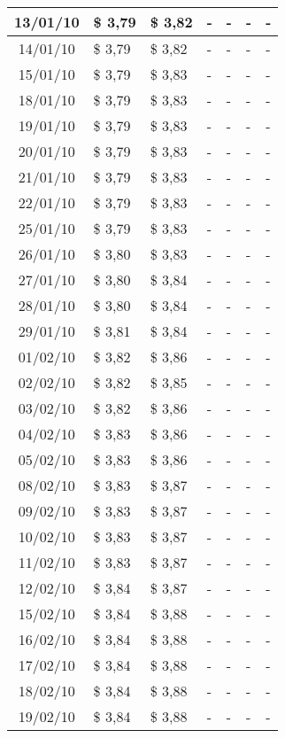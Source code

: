 \begin{center}
\begin{longtable}{|c|p{1.5cm}|p{1.5cm}|p{1.5cm}|p{1.5cm}|p{1.5cm}|p{1.5cm}|}
13/01/10 & \$ 3,79 & \$ 3,82 & - & - & - & - \\ \hline
14/01/10 & \$ 3,79 & \$ 3,82 & - & - & - & - \\ \hline
15/01/10 & \$ 3,79 & \$ 3,83 & - & - & - & - \\ \hline
18/01/10 & \$ 3,79 & \$ 3,83 & - & - & - & - \\ \hline
19/01/10 & \$ 3,79 & \$ 3,83 & - & - & - & - \\ \hline
20/01/10 & \$ 3,79 & \$ 3,83 & - & - & - & - \\ \hline
21/01/10 & \$ 3,79 & \$ 3,83 & - & - & - & - \\ \hline
22/01/10 & \$ 3,79 & \$ 3,83 & - & - & - & - \\ \hline
25/01/10 & \$ 3,79 & \$ 3,83 & - & - & - & - \\ \hline
26/01/10 & \$ 3,80 & \$ 3,83 & - & - & - & - \\ \hline
27/01/10 & \$ 3,80 & \$ 3,84 & - & - & - & - \\ \hline
28/01/10 & \$ 3,80 & \$ 3,84 & - & - & - & - \\ \hline
29/01/10 & \$ 3,81 & \$ 3,84 & - & - & - & - \\ \hline
01/02/10 & \$ 3,82 & \$ 3,86 & - & - & - & - \\ \hline
02/02/10 & \$ 3,82 & \$ 3,85 & - & - & - & - \\ \hline
03/02/10 & \$ 3,82 & \$ 3,86 & - & - & - & - \\ \hline
04/02/10 & \$ 3,83 & \$ 3,86 & - & - & - & - \\ \hline
05/02/10 & \$ 3,83 & \$ 3,86 & - & - & - & - \\ \hline
08/02/10 & \$ 3,83 & \$ 3,87 & - & - & - & - \\ \hline
09/02/10 & \$ 3,83 & \$ 3,87 & - & - & - & - \\ \hline
10/02/10 & \$ 3,83 & \$ 3,87 & - & - & - & - \\ \hline
11/02/10 & \$ 3,83 & \$ 3,87 & - & - & - & - \\ \hline
12/02/10 & \$ 3,84 & \$ 3,87 & - & - & - & - \\ \hline
15/02/10 & \$ 3,84 & \$ 3,88 & - & - & - & - \\ \hline
16/02/10 & \$ 3,84 & \$ 3,88 & - & - & - & - \\ \hline
17/02/10 & \$ 3,84 & \$ 3,88 & - & - & - & - \\ \hline
18/02/10 & \$ 3,84 & \$ 3,88 & - & - & - & - \\ \hline
19/02/10 & \$ 3,84 & \$ 3,88 & - & - & - & - \\ \hline

\end{longtable}
\end{center}
